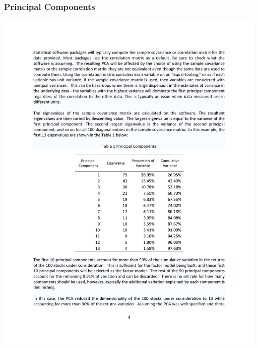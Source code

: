\begin{frame}
\frametitle{Principal Components}
\begin{center}
\includegraphics[height=0.85\textheight]{./resources/princomp2}
\end{center}
\end{frame}

